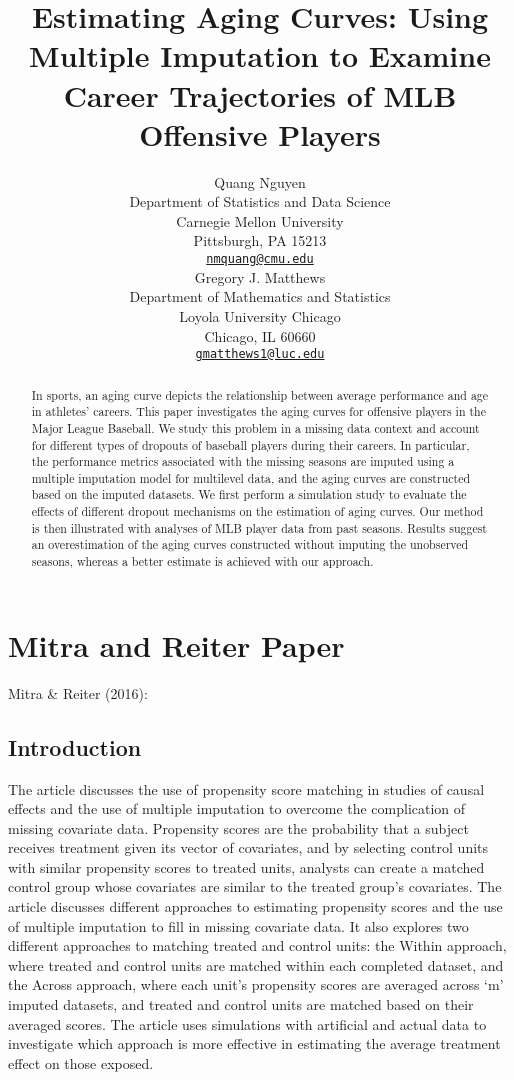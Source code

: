 \documentclass{article}
\title{\textbf{Estimating Aging Curves: Using Multiple Imputation to Examine Career Trajectories of MLB Offensive Players}}
\author{
    Quang Nguyen
   \\
    Department of Statistics and Data Science \\
    Carnegie Mellon University \\
  Pittsburgh, PA 15213 \\
  \texttt{\href{mailto:nmquang@cmu.edu}{\nolinkurl{nmquang@cmu.edu}}} \\
   \And
    Gregory J. Matthews
   \\
    Department of Mathematics and Statistics \\
    Loyola University Chicago \\
  Chicago, IL 60660 \\
  \texttt{\href{mailto:gmatthews1@luc.edu}{\nolinkurl{gmatthews1@luc.edu}}} \\
  }
\begin{document}
\maketitle


\begin{abstract}
In sports, an aging curve depicts the relationship between average
performance and age in athletes' careers. This paper investigates the
aging curves for offensive players in the Major League Baseball. We
study this problem in a missing data context and account for different
types of dropouts of baseball players during their careers. In
particular, the performance metrics associated with the missing seasons
are imputed using a multiple imputation model for multilevel data, and
the aging curves are constructed based on the imputed datasets. We first
perform a simulation study to evaluate the effects of different dropout
mechanisms on the estimation of aging curves. Our method is then
illustrated with analyses of MLB player data from past seasons. Results
suggest an overestimation of the aging curves constructed without
imputing the unobserved seasons, whereas a better estimate is achieved
with our approach.
\end{abstract}


\hypertarget{mitra-and-reiter-paper}{%
\section{Mitra and Reiter Paper}\label{mitra-and-reiter-paper}}

Mitra \& Reiter (2016):

\hypertarget{introduction}{%
\subsection{Introduction}\label{introduction}}

The article discusses the use of propensity score matching in studies of
causal effects and the use of multiple imputation to overcome the
complication of missing covariate data. Propensity scores are the
probability that a subject receives treatment given its vector of
covariates, and by selecting control units with similar propensity
scores to treated units, analysts can create a matched control group
whose covariates are similar to the treated group's covariates. The
article discusses different approaches to estimating propensity scores
and the use of multiple imputation to fill in missing covariate data. It
also explores two different approaches to matching treated and control
units: the Within approach, where treated and control units are matched
within each completed dataset, and the Across approach, where each
unit's propensity scores are averaged across `m' imputed datasets, and
treated and control units are matched based on their averaged scores.
The article uses simulations with artificial and actual data to
investigate which approach is more effective in estimating the average
treatment effect on those exposed.
\end{document}
